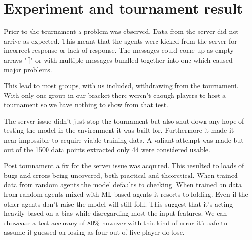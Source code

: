 \documentclass[../main.tex]{subfiles}
\begin{document}
\section{Experiment and tournament result}
Prior to the tournament a problem was observed. Data from the server did not arrive as expected. This meant that the agents were kicked from  the server for incorrect response or lack of response. The messages could come up as empty arrays "[]" or with multiple messages bundled together into one which caused major problems. 

This lead to most groups, with us included, withdrawing from the tournament. With only one group in our bracket there weren't enough players to host a tournament so we have nothing to show from that test.

The server issue didn't just stop the tournament but also shut down any hope of testing the model in the environment it was built for. Furthermore it made it near impossible to acquire viable training data. A valiant attempt was made but out of the 1500 data points extracted only 44 were considered usable.

Post tournament a fix for the server issue was acquired. This resulted to loads of bugs and errors being uncovered, both practical and theoretical. When trained data from random agents the model defaults to checking. When trained on data from random agents mixed with ML based agents it resorts to folding. Even if the other agents don't raise the model will still fold. This suggest that it's acting heavily based on a bias while disregarding most the input features. We can showcase a test accuracy of 80\% however with this kind of error it's safe to assume it guessed on losing as four out of five player do lose.
\end{document}

